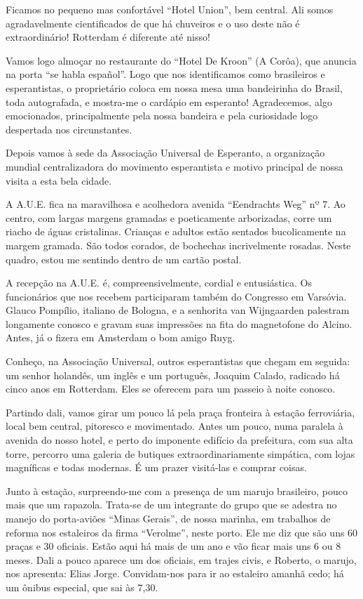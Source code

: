 Ficamos no pequeno mas confortável ``Hotel Union'', bem central. Ali somos agradavelmente cientificados de que há chuveiros e o uso deste não é extraordinário! Rotterdam é diferente até nisso!

Vamos logo almoçar no restaurante do ``Hotel De Kroon'' (A Corôa), que anuncia na porta ``se habla español''. Logo que nos identificamos como brasileiros e esperantistas, o proprietário coloca em nossa mesa uma bandeirinha do Brasil, toda autografada, e mostra-me o cardápio em esperanto! Agradecemos, algo emocionados, principalmente pela nossa bandeira e pela curiosidade logo despertada nos circunstantes.

Depois vamos à sede da Associação Universal de Esperanto, a organização mundial centralizadora do movimento esperantista e motivo principal de nossa visita a esta bela cidade.

A A.U.E. fica na maravilhosa e acolhedora avenida ``Eendrachts Weg'' nº 7. Ao centro, com largas margens gramadas e poeticamente arborizadas, corre um riacho de águas cristalinas. Crianças e adultos estão sentados bucolicamente na margem gramada. São todos corados, de bochechas incrivelmente rosadas. Neste quadro, estou me sentindo dentro de um cartão postal.

A recepção na A.U.E. é, compreensivelmente, cordial e entusiástica. Os funcionários que nos recebem participaram também do Congresso em Varsóvia. Glauco Pompílio, italiano de Bologna, e a senhorita van Wijngaarden palestram longamente conosco e gravam suas impressões na fita do magnetofone do Alcino. Antes, já o fizera em Amsterdam o bom amigo Ruyg.

Conheço, na Associação Universal, outros esperantistas que chegam em seguida: um senhor holandês, um inglês e um português, Joaquim Calado, radicado há cinco anos em Rotterdam. Eles se oferecem para um passeio à noite conosco.

Partindo dali, vamos girar um pouco lá pela praça fronteira à estação ferroviária, local bem central, pitoresco e movimentado. Antes um pouco, numa paralela à avenida do nosso hotel, e perto do imponente edifício da prefeitura, com sua alta torre, percorro uma galeria de butiques extraordinariamente simpática, com lojas magníficas e todas modernas. É um prazer visitá-las e comprar coisas.

Junto à estação, surpreendo-me com a presença de um marujo brasileiro, pouco mais que um rapazola. Trata-se de um integrante do grupo que se adestra no manejo do porta-aviões ``Minas Gerais'', de nossa marinha, em trabalhos de reforma nos estaleiros da firma ``Verolme'', neste porto. Ele me diz que são uns 60 praças e 30 oficiais. Estão aqui há mais de um ano e vão ficar mais uns 6 ou 8 meses. Dali a pouco aparece um dos oficiais, em trajes civis, e Roberto, o marujo, nos apresenta: Elias Jorge. Convidam-nos para ir ao estaleiro amanhã cedo; há um ônibus especial, que sai às 7,30.

